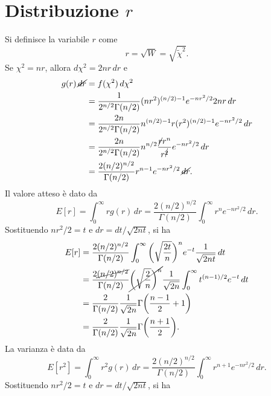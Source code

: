 \documentclass{article}
\theoremstyle{remark}
\begin{document}
\section{Distribuzione \texorpdfstring{$r$}{r}}
Si definisce la variabile $r$ come
\begin{equation}
    r = \sqrt{W} = \sqrt{\tilde{\chi}^2}.
\end{equation}
Se $\chi^2 = nr$, allora $d\chi^2 = 2nr\,dr$ e
\begin{equation}
    \begin{split}
        g(r)\,\cancel{dr} &= f(\chi^2)\,d\chi^2 \\
        &= \frac{1}{2^{n/2}\Gamma(n/2)}(nr^2)^{(n/2) - 1}e^{-nr^2/2}2nr\,dr \\
        &= \frac{2n}{2^{n/2}\Gamma(n/2)}n^{(n/2) - 1}r(r^2)^{(n/2) - 1}e^{-nr^2/2}\,dr \\
        &= \frac{2n}{2^{n/2}\Gamma(n/2)}n^{n/2}\frac{\cancel{r}r^n}{r^{\cancel{2}}}e^{-nr^2/2}\,dr \\
        &= \frac{2(n/2)^{n/2}}{\Gamma(n/2)}r^{n - 1}e^{-nr^2/2}\,\cancel{dr}.
    \end{split}
\end{equation}
Il valore atteso è dato da
\begin{equation}
    E[r] = \int_0^\infty rg(r)\,dr = \frac{2(n/2)^{n/2}}{\Gamma(n/2)}\int_0^\infty r^ne^{-nr^2/2}\,dr.
\end{equation}
Sostituendo $nr^2/2 = t$ e $dr = dt/\sqrt{2nt}$, si ha
\begin{equation}
    \begin{split}
        E[r] &= \frac{2(n/2)^{n/2}}{\Gamma(n/2)}\int_0^\infty \bigg(\sqrt{\frac{2t}{n}}\bigg)^{n}e^{-t}\frac{1} {\sqrt{2nt}}\,dt \\
        &= \frac{2\cancel{(n/2)^{n/2}}}{\Gamma(n/2)}\cancel{\bigg(\sqrt{\frac{2}{n}}\bigg)^{n}}\frac{1}{\sqrt{2n}}\int_0^\infty t^{(n - 1)/2}e^{-t}\,dt \\
        &= \frac{2}{\Gamma(n/2)}\frac{1}{\sqrt{2n}}\Gamma\bigg(\frac{n - 1}{2} + 1\bigg) \\
        &= \frac{2}{\Gamma(n/2)}\frac{1}{\sqrt{2n}}\Gamma\bigg(\frac{n + 1}{2}\bigg).
    \end{split}
\end{equation}
La varianza è data da
\begin{equation}
    E[r^2] = \int_0^\infty r^2g(r)\,dr = \frac{2(n/2)^{n/2}}{\Gamma(n/2)}\int_0^\infty r^{n + 1}e^{-nr^2/2}\,dr.
\end{equation}
Sostituendo $nr^2/2 = t$ e $dr = dt/\sqrt{2nt}$, si ha
\end{document}
